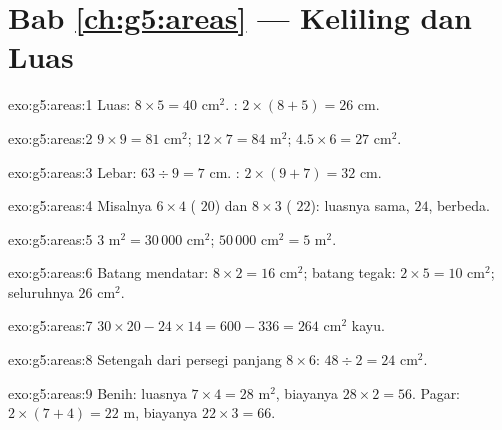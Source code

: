 \section*{Bab \ref{ch:g5:areas} --- Keliling dan Luas}

\begin{solution}{exo:g5:areas:1}
Luas: $8 \times 5 = 40$ cm$^2$. :
$2 \times (8 + 5) = 26$ cm.
\end{solution}

\begin{solution}{exo:g5:areas:2}
$9 \times 9 = 81$ cm$^2$; \quad $12 \times 7 = 84$ m$^2$; \quad
$4.5 \times 6 = 27$ cm$^2$.
\end{solution}

\begin{solution}{exo:g5:areas:3}
Lebar: $63 \div 9 = 7$ cm. : $2 \times (9 + 7) = 32$ cm.
\end{solution}

\begin{solution}{exo:g5:areas:4}
Misalnya $6 \times 4$ ( $20$) dan $8 \times 3$
( $22$): luasnya sama, $24$,  berbeda.
\end{solution}

\begin{solution}{exo:g5:areas:5}
$3$ m$^2 = 30\,000$ cm$^2$; \quad $50\,000$ cm$^2 = 5$ m$^2$.
\end{solution}

\begin{solution}{exo:g5:areas:6}
Batang mendatar: $8 \times 2 = 16$ cm$^2$; batang tegak:
$2 \times 5 = 10$ cm$^2$; seluruhnya $26$ cm$^2$.
\end{solution}

\begin{solution}{exo:g5:areas:7}
$30 \times 20 - 24 \times 14 = 600 - 336 = 264$ cm$^2$ kayu.
\end{solution}

\begin{solution}{exo:g5:areas:8}
Setengah dari persegi panjang $8 \times 6$: $48 \div 2 = 24$ cm$^2$.
\end{solution}

\begin{solution}{exo:g5:areas:9}
Benih: luasnya $7 \times 4 = 28$ m$^2$, biayanya $28 \times 2 = 56$.
Pagar:  $2 \times (7 + 4) = 22$ m, biayanya
$22 \times 3 = 66$.
\end{solution}

